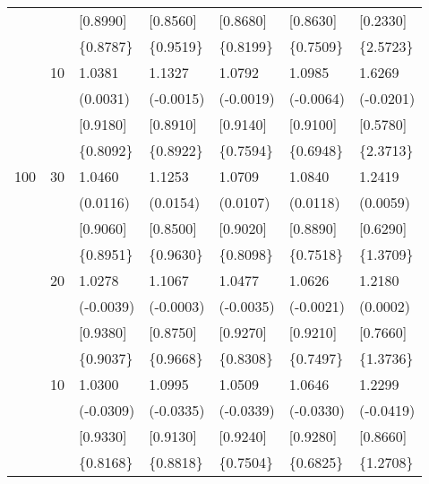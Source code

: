 \begin{table}[H]
{\begin{tabular}{c c | C{2.48cm} | C{2.48cm} | C{2.48cm} | C{2.48cm} | C{2.48cm} }
			&&[0.8990]&[0.8560]&[0.8680]&[0.8630]&[0.2330]\\
			&&\{0.8787\}&\{0.9519\}&\{0.8199\}&\{0.7509\}&\{2.5723\}\\
			&10&1.0381&1.1327&1.0792&1.0985&1.6269\\
			&&(0.0031)&(-0.0015)&(-0.0019)&(-0.0064)&(-0.0201)\\
			&&[0.9180]&[0.8910]&[0.9140]&[0.9100]&[0.5780]\\
			&&\{0.8092\}&\{0.8922\}&\{0.7594\}&\{0.6948\}&\{2.3713\}\\
			\cmidrule(lr){1-7}
			100&30&1.0460&1.1253&1.0709&1.0840&1.2419\\
			&&(0.0116)&(0.0154)&(0.0107)&(0.0118)&(0.0059)\\
			&&[0.9060]&[0.8500]&[0.9020]&[0.8890]&[0.6290]\\
			&&\{0.8951\}&\{0.9630\}&\{0.8098\}&\{0.7518\}&\{1.3709\}\\
			&20&1.0278&1.1067&1.0477&1.0626&1.2180\\
			&&(-0.0039)&(-0.0003)&(-0.0035)&(-0.0021)&(0.0002)\\
			&&[0.9380]&[0.8750]&[0.9270]&[0.9210]&[0.7660]\\
			&&\{0.9037\}&\{0.9668\}&\{0.8308\}&\{0.7497\}&\{1.3736\}\\
			&10&1.0300&1.0995&1.0509&1.0646&1.2299\\
			&&(-0.0309)&(-0.0335)&(-0.0339)&(-0.0330)&(-0.0419)\\
			&&[0.9330]&[0.9130]&[0.9240]&[0.9280]&[0.8660]\\
			&&\{0.8168\}&\{0.8818\}&\{0.7504\}&\{0.6825\}&\{1.2708\}\\
			\bottomrule[1.5pt]
	\end{tabular}}
	\label{table:table S.6}
\end{table}
